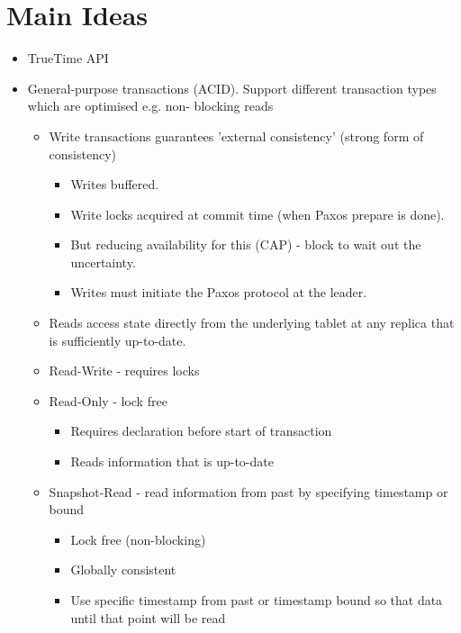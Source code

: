 \section{Main Ideas}
\begin{itemize}
    
    \item TrueTime API

    \item General-purpose transactions (ACID). Support different transaction types which are optimised e.g. non- blocking reads
    \begin{itemize}
        \item Write transactions guarantees 'external consistency' (strong form of consistency)
        \begin{itemize}
            \item Writes buffered. 
            \item Write locks acquired at commit time (when Paxos prepare is done). 
            \item But reducing availability for this (CAP) - block to wait out the uncertainty.
            \item Writes must initiate the Paxos protocol at the leader.
        \end{itemize}
        \item Reads access state directly from the underlying tablet at any replica that is sufficiently up-to-date.
        \item Read-Write - requires locks
        \item Read-Only - lock free
        \begin{itemize} 
            \item Requires declaration before start of transaction
            \item Reads information that is up-to-date
        \end{itemize}
        \item Snapshot-Read - read information from past by specifying timestamp or bound
        \begin{itemize}
            \item Lock free (non-blocking)
            \item Globally consistent
            \item Use specific timestamp from past or timestamp bound so that data until that point will be read
        \end{itemize}
    \end{itemize}


\end{itemize}
